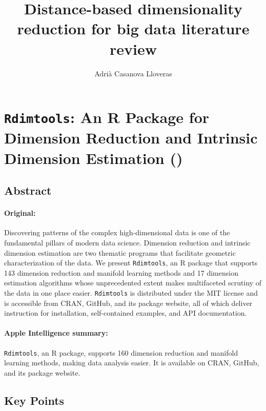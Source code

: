 \documentclass[a4paper,12pt]{article}
\title{Distance-based dimensionality reduction for big data literature review}
\author{Adrià Casanova Lloveras}
\begin{document}
\maketitle

\tableofcontents
\pagebreak

\section{\texttt{Rdimtools}: An R Package for Dimension Reduction
and Intrinsic Dimension Estimation (\texorpdfstring{\cite{You2022}}{})}
\label{sec:rdimtools}


\subsection{Abstract}

\paragraph{Original:} Discovering patterns of the complex high-dimensional data is one of the fundamental pillars of modern data science. Dimension reduction and intrinsic dimension estimation are two thematic programs that facilitate geometric characterization of the data. We present \texttt{Rdimtools}, an R package that supports 143 dimension reduction and manifold learning methods and 17 dimension estimation algorithms whose unprecedented extent makes multifaceted scrutiny of the data in one place easier. \texttt{Rdimtools} is distributed under the MIT license and is accessible from CRAN, GitHub, and its package website, all of which deliver instruction for installation, self-contained examples, and API documentation.

\paragraph{Apple Intelligence summary:} \texttt{Rdimtools}, an R package, supports 160 dimension reduction and manifold learning methods, making data analysis easier. It is available on CRAN, GitHub, and its package website.

\subsection{Key Points}
\end{document}
